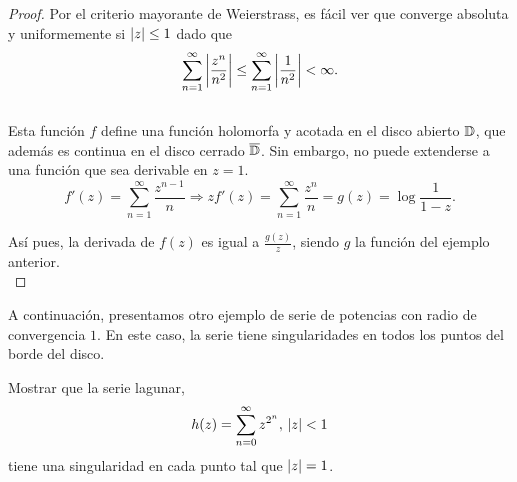 \begin{proof}
    Por el criterio mayorante de Weierstrass, es fácil ver que converge absoluta y uniformemente si $\left\lvert z\right\rvert \leq 1$ dado que
    \begin{equation*}
        \sum_{n=1}^{\infty} \left\lvert\frac{z^n}{n^2}\right\rvert \leq \sum_{n=1}^{\infty} \left\lvert\frac{1}{n^2}\right\rvert < \infty.
    \end{equation*}
    \\
    Esta función $f$ define una función holomorfa y acotada en el disco abierto $\mathbb{D}$, que además es continua en el disco cerrado $\overline{\mathbb{D}}$. Sin embargo, no puede extenderse a una función que sea derivable en $z = 1$. \\
    \begin{equation*}
        f'(z) =  \sum_{n=1}^{\infty} \frac{z^{n-1}}{n} \Rightarrow zf'(z) = \sum_{n=1}^{\infty} \frac{z^{n}}{n} = g(z) = \log{\frac{1}{1 - z}}.
    \end{equation*}

    Así pues, la derivada de $f(z)$ es igual a $\frac{g(z)}{z}$, siendo $g$ la función del ejemplo anterior. \\
\end{proof}


A continuación, presentamos otro ejemplo de serie de potencias con radio de convergencia $1$. En este caso, la serie tiene singularidades en todos los puntos del borde del disco. \\

\begin{example}
    Mostrar que la serie lagunar,
    \begin{equation*}
        h(z) = \sum_{n=0}^{\infty}  z^{2^n}, \, \left\lvert z\right\rvert < 1
    \end{equation*}
 tiene una singularidad en cada punto tal que $\left\lvert z\right\rvert = 1$.
\end{example}

